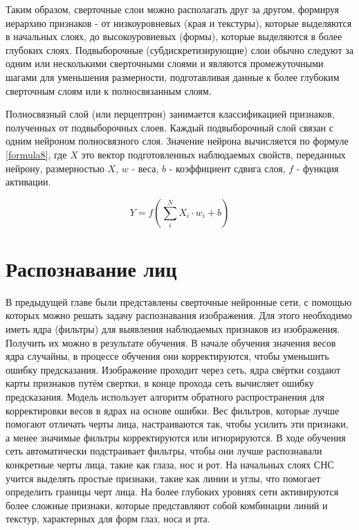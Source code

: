 Таким образом, сверточные слои можно располагать друг за другом, формируя иерархию признаков - от низкоуровневых (края и текстуры), которые выделяются в начальных слоях, до высокоуровневых (формы), которые выделяются в более глубоких слоях. Подвыборочные (субдискретизирующие) слои обычно следуют за одним или несколькими сверточными слоями и являются промежуточными шагами для уменьшения размерности, подготавливая данные к более глубоким сверточным слоям или к полносвязанным слоям.

Полносвязный слой (или перцептрон) занимается классификацией признаков, полученных от подвыборочных слоев. Каждый подвыборочный слой связан с одним нейроном полносвязного слоя. Значение нейрона вычисляется по формуле \ref{formula8}, где $X$ это вектор подготовленных наблюдаемых свойств, переданных нейрону, размерностью $X$, $w$ - веса, $b$ - коэффициент сдвига слоя, $f$ - функция активации.

\begin{equation}
Y = f(\sum_{i}^{N}X_i \cdot w_i + b)
\label{formula8}
\end{equation}

\chapter{Распознавание лиц}
В предыдущей главе были представлены сверточные нейронные сети, с помощью которых можно решать задачу распознавания изображения. Для этого необходимо иметь ядра (фильтры) для выявления наблюдаемых признаков из изображения. Получить их можно в результате обучения. В начале обучения значения весов ядра случайны, в процессе обучения они корректируются, чтобы уменьшить ошибку предсказания. Изображение проходит через сеть, ядра свёртки создают карты признаков  путём свертки, в конце прохода сеть вычисляет ошибку предсказания. Модель использует алгоритм обратного распространения для корректировки весов в ядрах на основе ошибки. Вес фильтров, которые лучше помогают отличать черты лица, настраиваются так, чтобы усилить эти признаки, а менее значимые фильтры корректируются или игнорируются. В ходе обучения сеть автоматически подстраивает фильтры, чтобы они лучше распознавали конкретные черты лица, такие как глаза, нос и рот. На начальных слоях СНС учится выделять простые признаки, такие как линии и углы, что помогает определить границы черт лица. На более глубоких уровнях сети активируются более сложные признаки, которые представляют собой комбинации линий и текстур, характерных для форм глаз, носа и рта.

